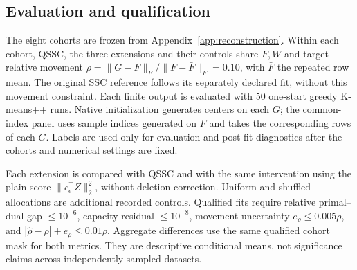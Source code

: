 {\subsection{Evaluation and qualification}

The eight cohorts are frozen from Appendix~\ref{app:reconstruction}.
Within each cohort, QSSC, the three extensions and their controls share $F,W$
and target relative movement
$\rho=\|G-F\|_F/\|F-\bar F\|_F=0.10$, with $\bar F$ the repeated row mean.
The original SSC reference follows its separately declared fit, without this
movement constraint. Each finite output is evaluated with
50 one-start greedy K-means++ runs. Native initialization generates centers
on each $G$; the common-index panel uses sample indices generated on $F$ and
takes the corresponding rows of each $G$. Labels are used only for evaluation
and post-fit diagnostics after the cohorts and numerical settings are fixed.

Each extension is compared with QSSC and with the same intervention using
the plain score $\|c_e^\top Z\|_2^2$, without deletion correction. Uniform and
shuffled allocations are additional recorded controls. Qualified fits require
relative primal--dual gap $\le10^{-6}$, capacity residual $\le10^{-8}$,
movement uncertainty $e_\rho\le0.005\rho$, and
$|\widehat\rho-\rho|+e_\rho\le0.01\rho$. Aggregate differences use the same
qualified cohort mask for both metrics. They are descriptive conditional means,
not significance claims across independently sampled datasets.

}
